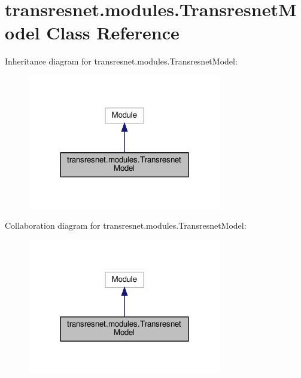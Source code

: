 \hypertarget{classtransresnet_1_1modules_1_1TransresnetModel}{}\section{transresnet.\+modules.\+Transresnet\+Model Class Reference}
\label{classtransresnet_1_1modules_1_1TransresnetModel}


Inheritance diagram for transresnet.\+modules.\+Transresnet\+Model\+:
\nopagebreak
\begin{figure}[H]
\begin{center}
\leavevmode
\includegraphics[width=240pt]{classtransresnet_1_1modules_1_1TransresnetModel__inherit__graph}
\end{center}
\end{figure}


Collaboration diagram for transresnet.\+modules.\+Transresnet\+Model\+:
\nopagebreak
\begin{figure}[H]
\begin{center}
\leavevmode
\includegraphics[width=240pt]{classtransresnet_1_1modules_1_1TransresnetModel__coll__graph}
\end{center}
\end{figure}
